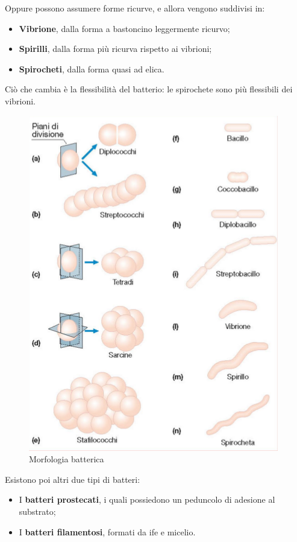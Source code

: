 \documentclass[11pt]{book}
\begin{document}
\vspace{1em}
Oppure possono assumere forme ricurve, e allora vengono suddivisi in:
\begin{itemize}
\item \textbf{Vibrione}, dalla forma a bastoncino leggermente ricurvo;
\item \textbf{Spirilli}, dalla forma più ricurva rispetto ai vibrioni;
\item \textbf{Spirocheti}, dalla forma quasi ad elica.
\end{itemize}
Ciò che cambia è la flessibilità del batterio: le spirochete sono più flessibili dei vibrioni.

\clearpage
\begin{figure}[htp]
\centering
\includegraphics[scale=0.5]{img/Morfologia batterica.png}
\caption{Morfologia batterica}
\label{}
\end{figure}

\vspace{1em}
Esistono poi altri due tipi di batteri:
\begin{itemize}
\item I \textbf{batteri prostecati}, i quali possiedono un peduncolo di adesione al substrato;
\item I \textbf{batteri filamentosi}, formati da ife e micelio.
\end{itemize}
\end{document}
